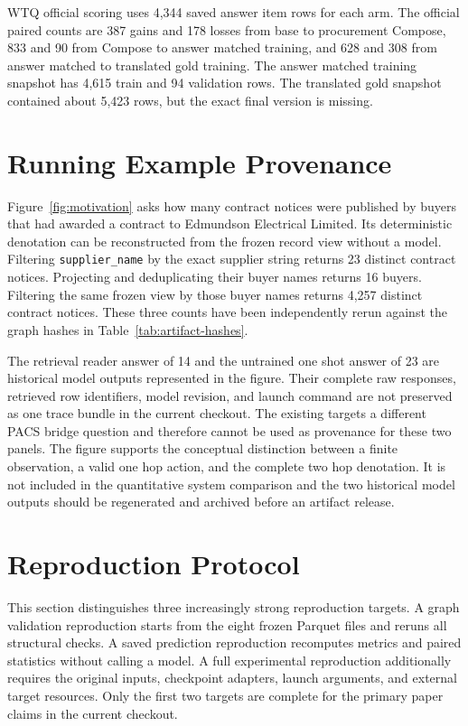 \documentclass{article}
\begin{document}
WTQ official scoring uses 4,344 saved answer item rows for each arm.  The official paired counts are
387 gains and 178 losses from base to procurement Compose, 833 and 90 from Compose to answer matched
training, and 628 and 308 from answer matched to translated gold training.  The answer matched
training snapshot has 4,615 train and 94 validation rows.  The translated gold snapshot contained
about 5,423 rows, but the exact final version is missing.

\section{Running Example Provenance}
\label{app:running-example}

Figure~\ref{fig:motivation} asks how many contract notices were published by buyers that had awarded
a contract to Edmundson Electrical Limited.  Its deterministic denotation can be reconstructed from
the frozen record view without a model.  Filtering \texttt{supplier\_name} by the exact supplier
string returns 23 distinct contract notices.  Projecting and deduplicating their buyer names returns
16 buyers.  Filtering the same frozen view by those buyer names returns 4,257 distinct contract
notices.  These three counts have been independently rerun against the graph hashes in
Table~\ref{tab:artifact-hashes}.

The retrieval reader answer of 14 and the untrained one shot answer of 23 are historical model
outputs represented in the figure.  Their complete raw responses, retrieved row identifiers, model
revision, and launch command are not preserved as one trace bundle in the current checkout.  The
existing  targets a different PACS bridge question and
therefore cannot be used as provenance for these two panels.  The figure supports the conceptual
distinction between a finite observation, a valid one hop action, and the complete two hop
denotation.  It is not included in the quantitative system comparison and the two historical model
outputs should be regenerated and archived before an artifact release.

\section{Reproduction Protocol}
\label{app:reproduction}

This section distinguishes three increasingly strong reproduction targets.  A graph validation
reproduction starts from the eight frozen Parquet files and reruns all structural checks.  A saved
prediction reproduction recomputes metrics and paired statistics without calling a model.  A full
experimental reproduction additionally requires the original inputs, checkpoint adapters, launch
arguments, and external target resources.  Only the first two targets are complete for the primary
paper claims in the current checkout.
\end{document}
